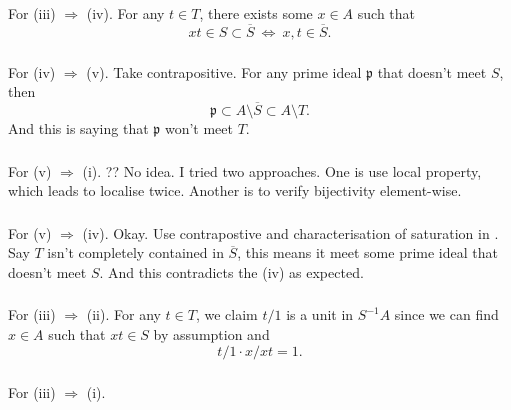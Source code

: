 \subsubsection{}\label{Atiyah Chapter 3 Ex 8. 3-4}

For (iii) $\Rightarrow$ (iv). For any $t\in T$, there exists some $x\in A$ such that 
\[xt\in S\subset \overline{S} ~\Leftrightarrow~ x,t\in\overline{S}.\]

\subsubsection{}

For (iv) $\Rightarrow$ (v). Take contrapositive. For any prime ideal $\mathfrak p$ that doesn't meet $S$, then \[\mathfrak p\subset A\setminus \overline{S}\subset A\setminus T.\] And this is saying that $\mathfrak p$ won't meet $T$.

\subsubsection{}

For (v) $\Rightarrow$ (i). 
?? No idea. I tried two approaches. One is use local property, which leads to localise twice. Another is to verify bijectivity element-wise.

\subsubsection{}

For (v) $\Rightarrow$ (iv). Okay. Use contrapostive and characterisation of saturation in . Say $T$ isn't completely contained in $\overline{S}$, this means it meet some prime ideal that doesn't meet $S$. And this contradicts the (iv) as expected.

\subsubsection{}

For (iii) $\Rightarrow$ (ii). For any $t\in T$, we claim $t/1$ is a unit in $S^{-1}A$ since we can find $x\in A$ such that $xt\in S$ by assumption and 
\[t/1\cdot x/xt = 1.\]

\subsubsection{}

For (iii) $\Rightarrow$ (i). 

